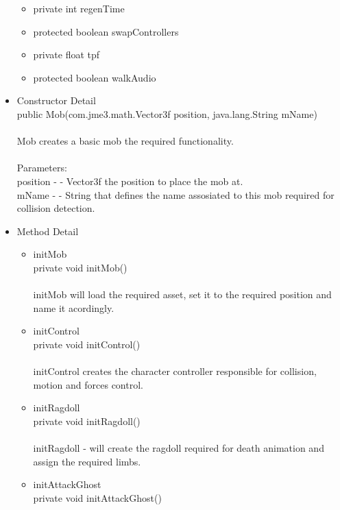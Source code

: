 \documentclass[letterpaper]{article}
\begin{document}
\begin{itemize}
\begin{itemize}
													\item	private int	regenTime 
													\item	protected boolean	swapControllers 
													\item	private float	tpf 
													\item	protected boolean	walkAudio 
												\end{itemize}
										\item	Constructor Detail \\
												public Mob(com.jme3.math.Vector3f position, java.lang.String mName) \\ \\ 
												Mob creates a basic mob the required functionality. \\ \\
												Parameters: \\
												position - - Vector3f the position to place the mob at. \\
												mName - - String that defines the name assosiated to this mob required for collision detection.
										\item	Method Detail
												\begin{itemize}
													\item	initMob \\
															private void initMob() \\ \\
															initMob will load the required asset, set it to the required position and name it acordingly. \\ 
													\item	initControl \\
															private void initControl() \\ \\
															initControl creates the character controller responsible for collision, motion and forces control.
													\item	initRagdoll \\
															private void initRagdoll() \\ \\
															initRagdoll - will create the ragdoll required for death animation and assign the required limbs.
													\item	initAttackGhost \\
															private void initAttackGhost() \\ \\

\end{itemize}
\end{itemize}
\end{document}
